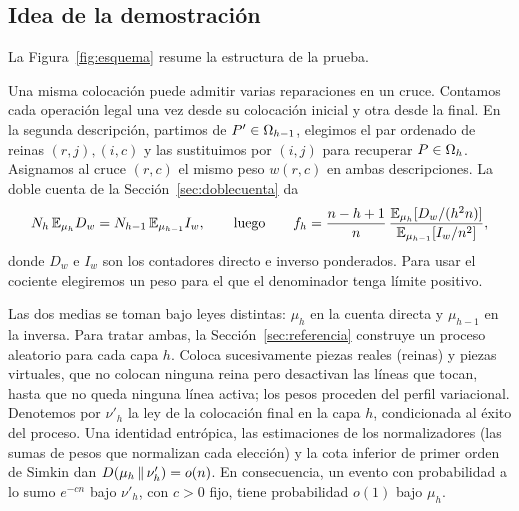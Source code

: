 \subsection{Idea de la demostración}\label{subsec:idea}

La Figura~\ref{fig:esquema} resume la estructura de la prueba.

Una misma colocación puede admitir varias reparaciones en un cruce. Contamos cada
operación legal una vez desde su colocación inicial y otra desde la final. En
la segunda descripción, partimos de $P'\in\Omega_{h-1}$, elegimos el par ordenado
de reinas $(r,j),(i,c)$ y las sustituimos por $(i,j)$ para recuperar $P\in\Omega_h$.
Asignamos al cruce $(r,c)$ el mismo peso $w(r,c)$ en ambas descripciones. La
doble cuenta de la Sección~\ref{sec:doblecuenta} da
\[
 N_h\,\mathbb{E}_{\mu_h}D_w=N_{h-1}\,\mathbb{E}_{\mu_{h-1}}I_w,\qquad\text{luego}\qquad
 f_h=\frac{n-h+1}{n}\,\frac{\mathbb{E}_{\mu_h}[D_w/(h^2n)]}{\mathbb{E}_{\mu_{h-1}}[I_w/n^2]},
\]
donde $D_w$ e $I_w$ son los contadores directo e inverso ponderados. Para usar el
cociente elegiremos un peso para el que el denominador tenga límite positivo.

Las dos medias se toman bajo leyes distintas: $\mu_h$ en la cuenta directa y
$\mu_{h-1}$ en la inversa. Para tratar ambas, la Sección~\ref{sec:referencia}
construye un proceso aleatorio para cada capa $h$. Coloca sucesivamente piezas reales
(reinas) y piezas virtuales, que no colocan ninguna reina pero desactivan las líneas que tocan,
hasta que no queda ninguna línea activa; los pesos proceden del perfil variacional. Denotemos por
$\nu'_h$ la ley de la colocación final en la capa $h$, condicionada al éxito del proceso. Una identidad
entrópica, las estimaciones
de los normalizadores (las sumas de pesos que normalizan cada elección) y la cota inferior de
primer orden de Simkin dan
$D(\mu_h\,\Vert\,\nu'_h)=o(n)$. En consecuencia, un evento con probabilidad a lo sumo
$e^{-cn}$ bajo $\nu'_h$, con $c>0$ fijo, tiene probabilidad $o(1)$ bajo $\mu_h$.
